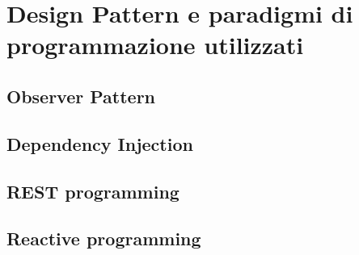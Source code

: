\section {Design Pattern e paradigmi di programmazione utilizzati}

\subsection{Observer Pattern}
\subsection{Dependency Injection}
\subsection{REST programming}
\subsection{Reactive programming}